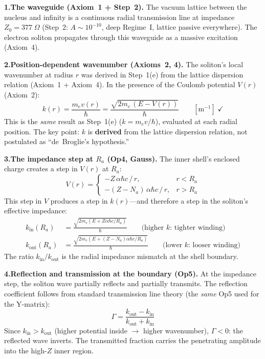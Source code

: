 \noindent\textbf{1.\;The waveguide (Axiom~1 + Step~2).}
The vacuum lattice between the nucleus and infinity is
a continuous radial transmission line at impedance
$Z_0 = 377\;\Omega$ (Step~2: $A \sim 10^{-10}$,
deep Regime~I, lattice passive everywhere).
The electron soliton propagates through this waveguide
as a massive excitation (Axiom~4).

\noindent\textbf{2.\;Position-dependent wavenumber
(Axioms~2, 4).}
The soliton's local wavenumber at radius $r$ was
derived in Step~1(e) from the lattice dispersion
relation (Axiom~1 + Axiom~4).  In the presence of
the Coulomb potential $V(r)$ (Axiom~2):
\begin{equation}
    k(r) = \frac{m_e v(r)}{\hbar}
    = \frac{\sqrt{2 m_e\,(E - V(r))}}{\hbar}
    \qquad [\text{m}^{-1}]\;\checkmark
    \label{eq:k_radial}
\end{equation}
This is the \emph{same} result as Step~1(e)
($k = m_e v / \hbar$), evaluated at each radial
position.  The key point: $k$ is \textbf{derived}
from the lattice dispersion relation, not postulated
as ``de~Broglie's hypothesis.''

\noindent\textbf{3.\;The impedance step at $R_a$
(Op4, Gauss).}
The inner shell's enclosed charge creates a step
in $V(r)$ at $R_a$:
\begin{equation}
    V(r) = \begin{cases}
    -Z\,\alpha\hbar c\,/\,r, & r < R_a
    \\[4pt]
    -(Z - N_a)\,\alpha\hbar c\,/\,r, & r > R_a
    \end{cases}
    \label{eq:V_step}
\end{equation}
This step in $V$ produces a step in $k(r)$---and
therefore a step in the soliton's effective impedance:
\begin{align}
    k_{\text{in}}(R_a)
    &= \frac{\sqrt{2m_e(E + Z\alpha\hbar c / R_a)}}
    {\hbar}
    \qquad\text{(higher $k$: tighter winding)} \\
    k_{\text{out}}(R_a)
    &= \frac{\sqrt{2m_e(E + (Z{-}N_a)\alpha\hbar c / R_a)}}
    {\hbar}
    \qquad\text{(lower $k$: looser winding)}
\end{align}
The ratio $k_{\text{in}} / k_{\text{out}}$ is the
radial impedance mismatch at the shell boundary.

\noindent\textbf{4.\;Reflection and transmission at the
boundary (Op5).}
At the impedance step, the soliton wave partially
reflects and partially transmits.  The reflection
coefficient follows from standard transmission line
theory (the \emph{same} Op5 used for the Y-matrix):
\begin{equation}
    \Gamma = \frac{k_{\text{out}} - k_{\text{in}}}
    {k_{\text{out}} + k_{\text{in}}}
    \label{eq:reflection_coeff}
\end{equation}
Since $k_{\text{in}} > k_{\text{out}}$
(higher potential inside $\to$ higher wavenumber),
$\Gamma < 0$: the reflected wave inverts.
The transmitted fraction carries the penetrating
amplitude into the high-$Z$ inner region.

